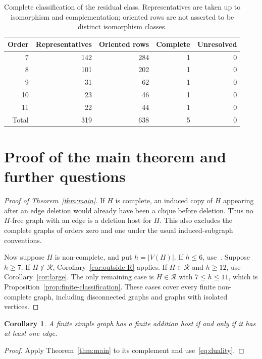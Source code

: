 \documentclass[11pt,reqno]{amsart}
\newtheorem{corollary}[theorem]{Corollary}
\theoremstyle{definition}
\theoremstyle{remark}
\newcommand{\Rclass}{\mathcal{R}}
\begin{document}
\begin{table}[htbp]
\centering
\caption{Complete classification of the residual class. Representatives are taken up to isomorphism and complementation; oriented rows are not asserted to be distinct isomorphism classes.}\label{tab:residual}
\begin{tabular}{rrrrr}\toprule
Order & Representatives & Oriented rows & Complete & Unresolved\\\midrule
7 & 142 & 284 & 1 & 0\\
8 & 101 & 202 & 1 & 0\\
9 & 31 & 62 & 1 & 0\\
10 & 23 & 46 & 1 & 0\\
11 & 22 & 44 & 1 & 0\\\midrule
Total & 319 & 638 & 5 & 0\\\bottomrule
\end{tabular}
\end{table}

\section{Proof of the main theorem and further questions}\label{sec:conclusion}

\begin{proof}[Proof of Theorem~\ref{thm:main}]
If $H$ is complete, an induced copy of $H$ appearing after an edge deletion would already have been a clique before deletion. Thus no $H$-free graph with an edge is a deletion host for $H$. This also excludes the complete graphs of orders zero and one under the usual induced-subgraph conventions.

Now suppose $H$ is non-complete, and put $h=|V(H)|$. If $h\le6$, use~\cite[Theorem~1.9]{FHHS}. Suppose $h\ge7$. If $H\notin\Rclass$, Corollary~\ref{cor:outside-R} applies. If $H\in\Rclass$ and $h\ge12$, use Corollary~\ref{cor:large}. The only remaining case is $H\in\Rclass$ with $7\le h\le11$, which is Proposition~\ref{prop:finite-classification}. These cases cover every finite non-complete graph, including disconnected graphs and graphs with isolated vertices.
\end{proof}

\begin{corollary}\label{cor:addition-main}
A finite simple graph has a finite addition host if and only if it has at least one edge.
\end{corollary}
\begin{proof}
Apply Theorem~\ref{thm:main} to its complement and use~\eqref{eq:duality}.
\end{proof}
\end{document}
